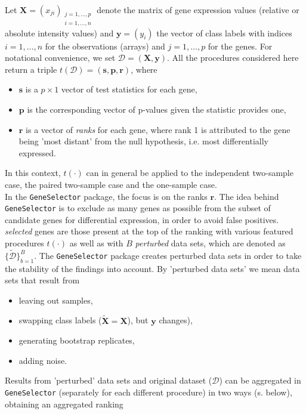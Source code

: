 Let $\bm{X}=(x_{ji})_{\substack{j=1,\ldots,p \\ i=1,\ldots,n}}$ denote the matrix
of gene expression values (relative or absolute intensity values)
and  $\bm{y}=(y_i)$ the vector of class labels with
indices $i=1,\ldots,n$ for the observations (arrays) and $j=1,\ldots,p$
for the genes. For notational convenience, we set $\mathcal{D}=(\bm{X}, \bm{y})$.
All the procedures considered here
 return a triple \hypertarget{procedure}{$t(\mathcal{D})=(\bm{s}, \bm{p}, \bm{r})$}, where
\begin{itemize}
\item $\bm{s}$ is a $p \times 1$ vector of test statistics for each gene,
\item $\bm{p}$  is the corresponding vector of p-values given
      the statistic provides one,
\item $\bm{r}$ is a vector of \emph{ranks} for each gene, where rank 1
      is attributed to the gene being 'most distant' from the null
      hypothesis, i.e. most differentially expressed.
\end{itemize}
In this context, $t(\cdot)$ can in general be applied to the
independent two-sample case, the paired two-sample case and the one-sample
case.\\
In the \texttt{GeneSelector} package, the focus is on the ranks $\bm{r}$. The idea
behind \texttt{GeneSelector} is to exclude as many genes as possible
from the subset of candidate genes for differential expression, in order
to avoid false positives. {\it selected} genes
are those present at the top of the ranking with various featured procedures
$t(\cdot)$ as well as with $B$ {\it perturbed} data sets, which are denoted as
$\{\widetilde{\mathcal{D}}\}_{b=1}^B$. The \texttt{GeneSelector} package creates
perturbed data sets in order to take the stability of the findings into account.
By 'perturbed data sets' we mean data sets that
result from
\begin{itemize}
\item leaving out samples,
\item swapping class labels ($\widetilde{\bm{X}}=\bm{X}$),
      but $\bm{y}$ changes),
\item generating bootstrap replicates,
\item adding noise.
\end{itemize}
Results from 'perturbed' data sets and original dataset ($\mathcal{D}$) can be
aggregated in \texttt{GeneSelector} (separately for each different procedure)
in two ways (s. below), obtaining an aggregated ranking
